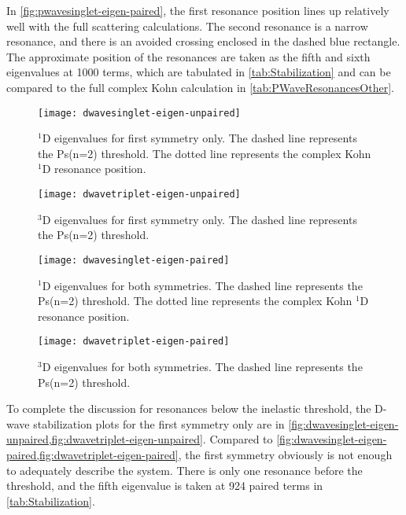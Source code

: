 \documentclass[Dissertation.tex]{subfiles}
\begin{document}
In \cref{fig:pwavesinglet-eigen-paired}, the first resonance position lines 
up relatively well with the full scattering calculations. The second 
resonance is a narrow resonance, and there is an avoided crossing enclosed in 
the dashed blue rectangle. The approximate position of the resonances are 
taken as the fifth and sixth eigenvalues at 1000 terms, which are tabulated 
in \cref{tab:Stabilization} and can be compared to the full complex Kohn 
calculation in \cref{tab:PWaveResonancesOther}.

\begin{figure}
	\centering
	\texttt{[image: dwavesinglet-eigen-unpaired]}
	\caption[$^1$D eigenvalues for first symmetry only]{$^1$D eigenvalues for first symmetry only. The dashed line represents the Ps(n=2) threshold. The dotted line represents the complex Kohn $^1$D resonance position.}
	\label{fig:dwavesinglet-eigen-unpaired}
\end{figure}

\begin{figure}
	\centering
	\texttt{[image: dwavetriplet-eigen-unpaired]}
	\caption[$^3$D eigenvalues for first symmetry only]{$^3$D eigenvalues for first symmetry only. The dashed line represents the Ps(n=2) threshold.}
	\label{fig:dwavetriplet-eigen-unpaired}
\end{figure}

\begin{figure}
	\centering
	\texttt{[image: dwavesinglet-eigen-paired]}
	\caption[$^1$D eigenvalues for both symmetries]{$^1$D eigenvalues for both symmetries. The dashed line represents the Ps(n=2) threshold. The dotted line represents the complex Kohn $^1$D resonance position.}
	\label{fig:dwavesinglet-eigen-paired}
\end{figure}

\begin{figure}
	\centering
	\texttt{[image: dwavetriplet-eigen-paired]}
	\caption[$^3$D eigenvalues for both symmetries]{$^3$D eigenvalues for both symmetries. The dashed line represents the Ps(n=2) threshold.}
	\label{fig:dwavetriplet-eigen-paired}
\end{figure}

To complete the discussion for resonances below the inelastic threshold, the
D-wave stabilization plots for the first symmetry only are in
\cref{fig:dwavesinglet-eigen-unpaired,fig:dwavetriplet-eigen-unpaired}. Compared to 
\cref{fig:dwavesinglet-eigen-paired,fig:dwavetriplet-eigen-paired}, the first 
symmetry obviously is not enough to adequately describe the system. There is 
only one resonance before the threshold, and the fifth eigenvalue is taken at 
924 paired terms in \cref{tab:Stabilization}.
\end{document}

